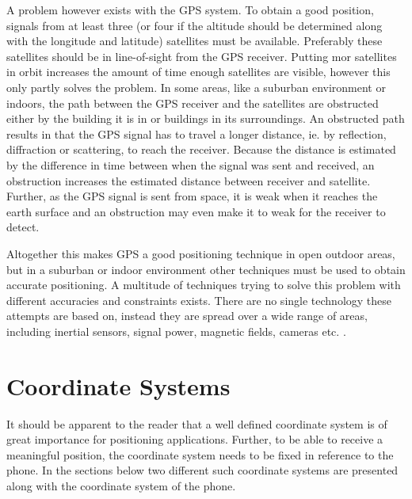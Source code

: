 \documentclass{LTHthesis}
\begin{document}
A problem however exists with the GPS system. To obtain a good position, signals from at least three (or four if the altitude should be determined along with the longitude and latitude) satellites must be available. Preferably these satellites should be in line-of-sight from the GPS receiver. Putting mor satellites in orbit increases the amount of time enough satellites are visible, however this only partly solves the problem. In some areas, like a suburban environment or indoors, the path between the GPS receiver and the satellites are obstructed either by the building it is in or buildings in its surroundings. An obstructed path results in that the GPS signal has to travel a longer distance, ie. by reflection, diffraction or scattering, to reach the receiver. Because the distance is estimated by the difference in time between when the signal was sent and received, an obstruction increases the estimated distance between receiver and satellite. Further, as the GPS signal is sent from space, it is weak when it reaches the earth surface and an obstruction may even make it to weak for the receiver to detect.

Altogether this makes GPS a good positioning technique in open outdoor areas, but in a suburban or indoor environment other techniques must be used to obtain accurate positioning. A multitude of techniques trying to solve this problem with different accuracies and constraints exists. There are no single technology these attempts are based on, instead they are spread over a wide range of areas, including inertial sensors, signal power, magnetic fields, cameras etc. \cite{positioning_overview}. 
%
\section{Coordinate Systems}
It should be apparent to the reader that a well defined coordinate system is of great importance for positioning applications. Further, to be able to receive a meaningful position, the coordinate system needs to be fixed in reference to the phone. In the sections below two different such coordinate systems are presented along with the coordinate system of the phone. 
\end{document}
